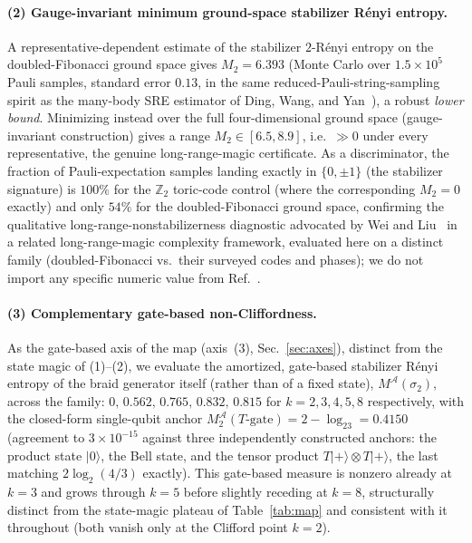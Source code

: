 \documentclass[aps,pra,twocolumn,superscriptaddress,longbibliography,floatfix,nofootinbib]{revtex4-2}
\providecommand{\ket}[1]{\lvert #1 \rangle}
\begin{document}
\paragraph{(2) Gauge-invariant minimum ground-space stabilizer Rényi
entropy.} A representative-dependent estimate of the stabilizer
$2$-Rényi entropy on the doubled-Fibonacci ground space gives
$M_2=6.393$ (Monte Carlo over $1.5\times10^5$ Pauli samples, standard
error $0.13$, in the same reduced-Pauli-string-sampling spirit as the
many-body SRE estimator of Ding, Wang, and
Yan~\cite{Ding2025}), a robust \emph{lower bound}. Minimizing instead over
the full four-dimensional ground space (gauge-invariant construction)
gives a range $M_2\in[6.5,8.9]$, i.e.\ $\gg0$ under every
representative, the genuine long-range-magic certificate. As a
discriminator, the fraction of Pauli-expectation samples landing
exactly in $\{0,\pm1\}$ (the stabilizer signature) is $100\%$ for the
$\mathbb{Z}_2$ toric-code control (where the corresponding $M_2=0$
exactly) and only $54\%$ for the doubled-Fibonacci ground space,
confirming the qualitative long-range-nonstabilizerness diagnostic
advocated by Wei and Liu~\cite{WeiLiu2025} in a related
long-range-magic complexity framework, evaluated here on a distinct
family (doubled-Fibonacci vs.\ their surveyed codes and phases); we
do not import any specific numeric value from Ref.~\cite{WeiLiu2025}.

\paragraph{(3) Complementary gate-based non-Cliffordness.} As the
gate-based axis of the map (axis~(3), Sec.~\ref{sec:axes}), distinct
from the state magic of (1)--(2), we evaluate the amortized,
gate-based stabilizer Rényi entropy of the braid generator
itself (rather than of a fixed state), $M^{\mathcal A}(\sigma_2)$,
across the family: $0,\,0.562,\,0.765,\,0.832,\,0.815$ for
$k=2,3,4,5,8$ respectively, with the closed-form single-qubit anchor
$M_2^{\mathcal A}(T\text{-gate})=2-\log_23=0.4150$ (agreement to
$3\times10^{-15}$ against three independently constructed anchors:
the product state $\ket0$, the Bell state, and the tensor product
$T\ket+\otimes T\ket+$, the last matching $2\log_2(4/3)$ exactly).
This gate-based measure is nonzero already at $k=3$ and grows through
$k=5$ before slightly receding at $k=8$, structurally distinct from
the state-magic plateau of Table~\ref{tab:map} and consistent with it
throughout (both vanish only at the Clifford point $k=2$).
\end{document}

